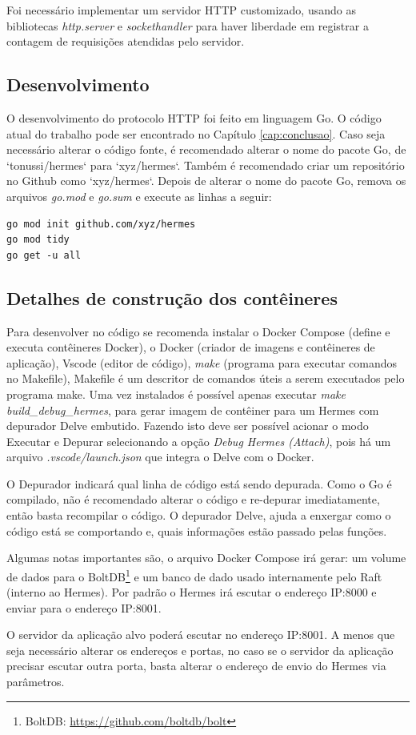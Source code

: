 Foi necessário implementar um servidor \gls{HTTP} customizado, usando as bibliotecas \textit{http.server} e \textit{sockethandler} para haver liberdade em registrar a contagem de requisições atendidas pelo servidor.

\subsection{Desenvolvimento}

O desenvolvimento do protocolo \gls{HTTP} foi feito em linguagem Go. O código atual do trabalho pode ser encontrado no Capítulo \ref{cap:conclusao}. Caso seja necessário alterar o código fonte, é recomendado alterar o nome do pacote Go, de `tonussi/hermes` para `xyz/hermes`. Também é recomendado criar um repositório no Github como `xyz/hermes`. Depois de alterar o nome do pacote Go, remova os arquivos \textit{go.mod} e \textit{go.sum} e execute as linhas a seguir:

\begin{verbatim}
go mod init github.com/xyz/hermes
go mod tidy
go get -u all
\end{verbatim}

\subsection{Detalhes de construção dos contêineres}

Para desenvolver no código se recomenda instalar o Docker Compose (define e executa contêineres Docker), o Docker (criador de imagens e contêineres de aplicação), Vscode (editor de código), \textit{make} (programa para executar comandos no Makefile), Makefile é um descritor de comandos úteis a serem executados pelo programa make. Uma vez instalados é possível apenas executar \textit{make build\_debug\_hermes}, para gerar imagem de contêiner para um Hermes com depurador Delve embutido. Fazendo isto deve ser possível acionar o modo Executar e Depurar selecionando a opção \textit{Debug Hermes (Attach)}, pois há um arquivo \textit{.vscode/launch.json} que integra o Delve com o Docker.

O Depurador indicará qual linha de código está sendo depurada. Como o Go é compilado, não é recomendado alterar o código e re-depurar imediatamente, então basta recompilar o código. O depurador Delve, ajuda a enxergar como o código está se comportando e, quais informações estão passado pelas funções.

Algumas notas importantes são, o arquivo Docker Compose irá gerar: um volume de dados para o BoltDB\footnote{BoltDB: \url{https://github.com/boltdb/bolt}} e um banco de dado usado internamente pelo Raft (interno ao Hermes). Por padrão o Hermes irá escutar o endereço \gls{IP}:8000 e enviar para o endereço \gls{IP}:8001.

O servidor da aplicação alvo poderá escutar no endereço \gls{IP}:8001. A menos que seja necessário alterar os endereços e portas, no caso se o servidor da aplicação precisar escutar outra porta, basta alterar o endereço de envio do Hermes via parâmetros.

